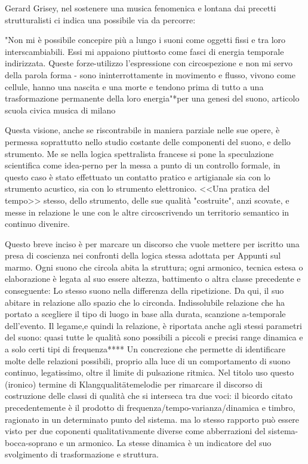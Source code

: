 Gerard Grisey, nel sostenere una musica fenomenica e lontana dai precetti strutturalisti ci indica una possibile via da percorre:

"Non mi è possibile concepire più a lungo i suoni come oggetti fissi e tra loro interscambiabili. Essi mi appaiono piuttosto come fasci di energia temporale indirizzata. Queste forze-utilizzo l'espressione con circospezione e non mi servo della parola forma - sono ininterrottamente in movimento e flusso, vivono come cellule, hanno una nascita e una morte e tendono prima di tutto a una trasformazione permanente della loro energia"*per una genesi del suono, articolo scuola civica musica di milano

Questa visione, anche se riscontrabile in maniera parziale nelle sue opere, è permessa soprattutto nello studio costante delle componenti del suono, e dello strumento.
Me se nella logica spettralista francese si pone la speculazione scientifica come idea-perno per la messa a punto di un controllo formale, in questo caso è stato effettuato un contatto pratico e artigianale sia con lo strumento acustico, sia con lo strumento elettronico.
<<Una pratica del tempo>> stesso, dello strumento, delle sue qualità "costruite", anzi scovate, e messe in relazione le une con le altre circoscrivendo un territorio semantico in continuo divenire.

Questo breve inciso è per marcare un discorso che vuole mettere per iscritto una presa di coscienza nei confronti della logica stessa adottata per Appunti sul marmo.
Ogni suono che circola abita la struttura; ogni armonico, tecnica estesa o elaborazione è legata al suo essere altezza, battimento o altra classe precedente e conseguente: Lo stesso suono nella differenza della ripetizione.
Da qui, il suo abitare in relazione allo spazio che lo circonda. Indissolubile relazione che ha portato a scegliere il tipo di luogo in base alla durata, scanzione a-temporale dell'evento.
Il legame,e quindi la relazione, è riportata anche agli stessi parametri del suono: quasi tutte le qualità sono possibili a piccoli e precisi range  dinamica e a solo certi tipi di frequenza****
Un concrezione che permette di identificare molte delle relazioni possibili, proprio alla luce di un comportamento di suono continuo, legatissimo, oltre il limite di pulsazione ritmica.
Nel titolo uso questo (ironico) termine di Klangqualitätemelodie  per rimarcare il discorso di costruzione delle classi di qualità che si interseca tra due voci:
il bicordo citato precedentemente è il prodotto di frequenza/tempo-varianza/dinamica e timbro, ragionato in un determinato punto del sistema.
ma lo stesso rapporto può essere visto per due coponenti qualitativamente diverse come abberrazioni del sistema-bocca-soprano e un armonico.
La stesse dinamica è un indicatore del suo svolgimento di trasformazione e struttura.

